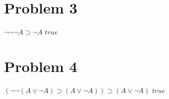 \documentclass{article}
\begin{document}
\section{Problem 3}
\begin{lemma}
  $\lnot\lnot\lnot A \supset \lnot A$ $true$
\end{lemma}
\begin{center}
  \begin{prooftree}
  \end{prooftree}
\end{center}

\section{Problem 4}
\begin{lemma}
  $(\lnot\lnot(A \lor \lnot A) \supset (A \lor \lnot A)) \supset (A \lor \lnot A)$ $true$
\end{lemma}
\begin{center}
  \begin{prooftree}
  \end{prooftree}
\end{center}
\end{document}
